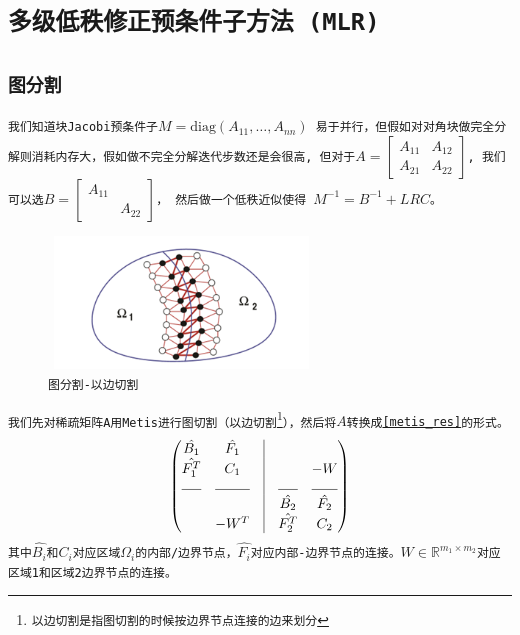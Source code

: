 \documentclass[11pt, a4paper]{article}
\theoremstyle{plain}
\theoremstyle{plain}
\theoremstyle{plain}
\theoremstyle{definition}
\theoremstyle{remark}
\theoremstyle{definition}
\newcommand{\T}[1]{\texttt{#1}}
\begin{document}
\section{\T{多级低秩修正预条件子方法 (MLR)}}
\subsection{\T{图分割}}
\T{我们知道块Jacobi预条件子$M = \text{diag}(A_{11}, \ldots, A_{nn})$ 易于并行，但假如对对角块做完全分解则消耗内存大，假如做不完全分解迭代步数还是会很高, 但对于$A = \begin{bmatrix} A_{11} & A_{12} \\ A_{21} & A_{22} \end{bmatrix}$, 我们可以选$B = \begin{bmatrix} A_{11} & \\ & A_{22} \end{bmatrix}$， 然后做一个低秩近似使得 $M^{-1} = B^{-1}+LRC$。
}


\begin{figure}[H]
	\label{domain}
	\caption{\T{图分割-以边切割\cite{MLR}}}
	\centering
	\includegraphics[width=200pt,height=100pt]{graph.png}
\end{figure}

\T{我们先对稀疏矩阵A用Metis\cite{Metis}进行图切割（以边切割\footnote{以边切割是指图切割的时候按边界节点连接的边来划分}），然后将$A$转换成\eqref{metis_res}的形式\cite{MLR}。}
\begin{equation}
	\label{metis_res}
	\begin{pmatrix}
		\hat{B_{1}} & \hat{F_{1}} & \vline & & \\
		\hat{F_{1}^T} & C_1 & \vline & & -W \\
		\hrulefill & \hrulefill & \vline & \hrulefill & \hrulefill \\
		& & \vline & \hat{B_{2}} & \hat{F_{2}} \\
		& -W^T & \vline & \hat{F_{2}^T} & C_2
	\end{pmatrix}
\end{equation}
\T{其中$\hat{B_i}$和$C_i$对应区域$\Omega_i$的内部/边界节点，$\hat{F_i}$对应内部-边界节点的连接。$W\in \mathbb{R}^{m_1 \times m_2}$对应区域1和区域2边界节点的连接。
}
\end{document}
